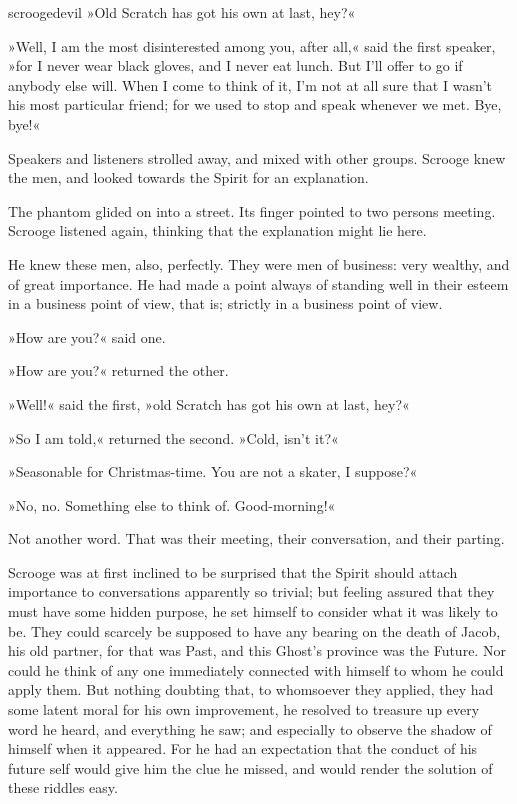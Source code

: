 \begin{colorbigpic}
	[\smallpicsize]
	{scroogedevil}
	{»Old Scratch has got his own at last, hey?«}
\end{colorbigpic}

»Well, I am the most disinterested among you, after all,« said the first speaker, »for I never wear black gloves, and I never eat lunch. But I'll offer to go if anybody else will. When I come to think of it, I'm not at all sure that I wasn't his most particular friend; for we used to stop and speak whenever we met. Bye, bye!«

Speakers and listeners strolled away, and mixed with other groups. Scrooge knew the men, and looked towards the Spirit for an explanation.

The phantom glided on into a street. Its finger pointed to two persons meeting. Scrooge listened again, thinking that the explanation might lie here.

He knew these men, also, perfectly. They were men of business: very wealthy, and of great importance. He had made a point always of standing well in their esteem in a business point of view, that is; strictly in a business point of view.

»How are you?« said one.

»How are you?« returned the other.

»Well!« said the first, »old Scratch has got his own at last, hey?«

»So I am told,« returned the second. »Cold, isn't it?«

»Seasonable for Christmas-time. You are not a skater, I suppose?«

»No, no. Something else to think of. Good-morning!«

Not another word. That was their meeting, their conversation, and their parting.

Scrooge was at first inclined to be surprised that the Spirit should attach importance to conversations apparently so trivial; but feeling assured that they must have some hidden purpose, he set himself to consider what it was likely to be. They could scarcely be supposed to have any bearing on the death of Jacob, his old partner, for that was Past, and this Ghost's province was the Future. Nor could he think of any one immediately connected with himself to whom he could apply them. But nothing doubting that, to whomsoever they applied, they had some latent moral for his own improvement, he resolved to treasure up every word he heard, and everything he saw; and especially to observe the shadow of himself when it appeared. For he had an expectation that the conduct of his future self would give him the clue he missed, and would render the solution of these riddles easy.

